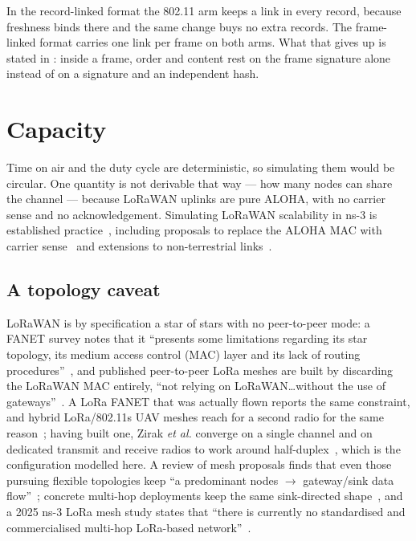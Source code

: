 In the record-linked format the 802.11 arm keeps a link in every record, because freshness binds there
and the same change buys no extra records. The frame-linked format carries one link per frame on both
arms. What that gives up is stated in : inside a frame, order and content rest on
the frame signature alone instead of on a signature and an independent hash.

\section{Capacity}

Time on air and the duty cycle are deterministic, so simulating them would be circular. One
quantity is not derivable that way --- how many nodes can share the channel --- because LoRaWAN
uplinks are pure ALOHA, with no carrier sense and no acknowledgement. Simulating LoRaWAN
scalability in ns-3 is established practice~\cite{vandenabeele2017scalability}, including
proposals to replace the ALOHA MAC with carrier sense~\cite{to2018loracsma} and extensions to
non-terrestrial links~\cite{traspadini2025lorantn}.

\subsection{A topology caveat}

LoRaWAN is by specification a star of stars with no peer-to-peer mode: a FANET survey notes that
it ``presents some limitations regarding its star topology, its medium access control (MAC) layer
and its lack of routing procedures''~\cite{paredes2023lorafanet}, and published peer-to-peer LoRa
meshes are built by discarding the LoRaWAN MAC entirely, ``not relying on LoRaWAN\ldots without
the use of gateways''~\cite{berto2021loramesh}. A LoRa FANET that was actually flown reports the
same constraint, and hybrid LoRa/802.11s UAV meshes reach for a second radio for the same
reason~\cite{davoli2021hybridlora}; having built one, Zirak \emph{et al.} converge on a single
channel and on dedicated transmit and receive radios to work around
half-duplex~\cite{zirak2021swarm}, which is the configuration modelled here. A review of mesh
proposals finds that even those pursuing flexible topologies keep ``a predominant nodes
$\rightarrow$ gateway/sink data flow''~\cite{centelles2021beyondstar}; concrete multi-hop
deployments keep the same sink-directed shape~\cite{abrardo2019multihoplora,jiang2020hybridlpwan},
and a 2025 ns-3 LoRa mesh study states that ``there is currently no standardised and
commercialised multi-hop LoRa-based network''~\cite{durand2025loramesh}.

